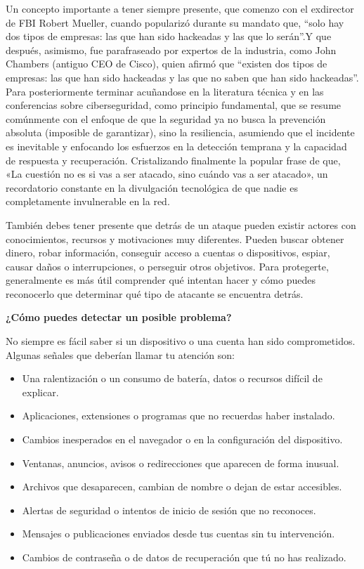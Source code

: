 \documentclass[
  spanish,
  a4paper,
  openany]{book}
\begin{document}
Un concepto importante a tener siempre presente, que comenzo con el exdirector de FBI Robert Mueller, cuando popularizó durante su mandato que, ``solo hay dos tipos de empresas: las que han sido hackeadas y las que lo serán''.Y que después, asimismo, fue parafraseado por expertos de la industria, como John Chambers (antiguo CEO de Cisco), quien afirmó que ``existen dos tipos de empresas: las que han sido hackeadas y las que no saben que han sido hackeadas''. Para posteriormente terminar acuñandose en la literatura técnica y en las conferencias sobre ciberseguridad, como principio fundamental, que se resume comúnmente con el enfoque de que la seguridad ya no busca la prevención absoluta (imposible de garantizar), sino la resiliencia, asumiendo que el incidente es inevitable y enfocando los esfuerzos en la detección temprana y la capacidad de respuesta y recuperación. Cristalizando finalmente la popular frase de que, «La cuestión no es si vas a ser atacado, sino cuándo vas a ser atacado», un recordatorio constante en la divulgación tecnológica de que nadie es completamente invulnerable en la red.

También debes tener presente que detrás de un ataque pueden existir actores con conocimientos, recursos y motivaciones muy diferentes. Pueden buscar obtener dinero, robar información, conseguir acceso a cuentas o dispositivos, espiar, causar daños o interrupciones, o perseguir otros objetivos. Para protegerte, generalmente es más útil comprender qué intentan hacer y cómo puedes reconocerlo que determinar qué tipo de atacante se encuentra detrás.

\textbf{¿Cómo puedes detectar un posible problema?}

No siempre es fácil saber si un dispositivo o una cuenta han sido comprometidos. Algunas señales que deberían llamar tu atención son:

\begin{itemize}
\item
  Una ralentización o un consumo de batería, datos o recursos difícil de explicar.
\item
  Aplicaciones, extensiones o programas que no recuerdas haber instalado.
\item
  Cambios inesperados en el navegador o en la configuración del dispositivo.
\item
  Ventanas, anuncios, avisos o redirecciones que aparecen de forma inusual.
\item
  Archivos que desaparecen, cambian de nombre o dejan de estar accesibles.
\item
  Alertas de seguridad o intentos de inicio de sesión que no reconoces.
\item
  Mensajes o publicaciones enviados desde tus cuentas sin tu intervención.
\item
  Cambios de contraseña o de datos de recuperación que tú no has realizado.
\end{itemize}
\end{document}
